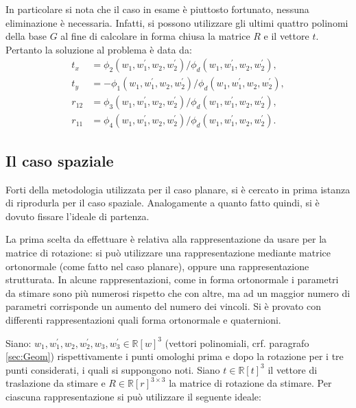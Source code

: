 In particolare si nota che il caso in esame è piuttosto fortunato, nessuna eliminazione è necessaria. Infatti, si possono utilizzare gli ultimi quattro polinomi della base $G$ al fine di calcolare in forma chiusa la matrice $R$ e il vettore $t$.
Pertanto la soluzione al problema è data da:
\begin{align}
	t_x &= \phi_2(w_1, w_1^{'}, w_2, w_2^{'})/\phi_d(w_1, w_1^{'}, w_2, w_2^{'}),\\
	t_y &= - \phi_1(w_1, w_1^{'}, w_2, w_2^{'})/\phi_d(w_1, w_1^{'}, w_2, w_2^{'}),\\
	r_{12} &= \phi_3(w_1, w_1^{'}, w_2, w_2^{'})/\phi_d(w_1, w_1^{'}, w_2, w_2^{'}),\\
	r_{11} &= \phi_4(w_1, w_1^{'}, w_2, w_2^{'})/\phi_d(w_1, w_1^{'}, w_2, w_2^{'}).
\end{align}
\subsection{Il caso spaziale}
\label{sec:groeb:spaz}

Forti della metodologia utilizzata per il caso planare, si è cercato in prima istanza di riprodurla per il caso spaziale. Analogamente a quanto fatto quindi, si è dovuto fissare l'ideale di partenza. 

La prima scelta da effettuare è relativa alla rappresentazione da usare per la matrice di rotazione: si può utilizzare una rappresentazione mediante matrice ortonormale (come fatto nel caso planare), oppure una rappresentazione strutturata. In alcune rappresentazioni, come in forma ortonormale i parametri da stimare sono più numerosi rispetto che con altre, ma ad un maggior numero di parametri corrisponde un aumento del numero dei vincoli. 
Si è provato con differenti rappresentazioni quali forma ortonormale e quaternioni.

Siano: $w_1, w_1^{'}, w_2, w_2^{'}, w_3, w_3^{'} \in \mathbb{R}[w]^3$ (vettori polinomiali, crf. paragrafo \ref{sec:Geom}) rispettivamente i punti omologhi prima e dopo la rotazione per i tre punti considerati, i quali si suppongono noti. Siano $t \in \mathbb{R}[t]^3$ il vettore di traslazione da stimare e $R \in \mathbb{R}[r]^{3 \times 3}$ la matrice di rotazione da stimare. Per ciascuna rappresentazione si può utilizzare il seguente ideale:

